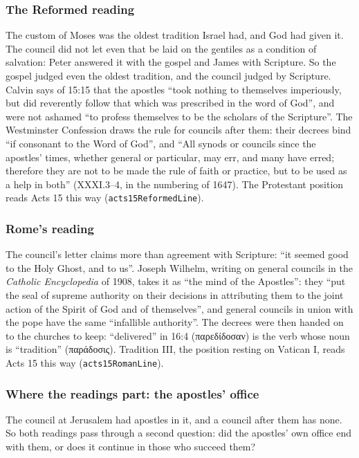 \documentclass[11pt]{article}
\begin{document}
\subsubsection*{The Reformed reading}
The custom of Moses was the oldest tradition Israel had, and God had given it. The council did not let even that be laid on the gentiles as a condition of salvation: Peter answered it with the gospel and James with Scripture. So the gospel judged even the oldest tradition, and the council judged by Scripture. Calvin says of 15:15 that the apostles “took nothing to themselves imperiously, but did reverently follow that which was prescribed in the word of God”, and were not ashamed “to profess themselves to be the scholars of the Scripture”. The Westminster Confession draws the rule for councils after them: their decrees bind “if consonant to the Word of God”, and “All synods or councils since the apostles’ times, whether general or particular, may err, and many have erred; therefore they are not to be made the rule of faith or practice, but to be used as a help in both” (XXXI.3–4, in the numbering of 1647). The Protestant position reads Acts 15 this way (\texttt{acts15\allowbreak{}Reformed\allowbreak{}Line}).

\subsubsection*{Rome’s reading}
The council’s letter claims more than agreement with Scripture: “it seemed good to the Holy Ghost, and to us”. Joseph Wilhelm, writing on general councils in the \emph{Catholic Encyclopedia} of 1908, takes it as “the mind of the Apostles”: they “put the seal of supreme authority on their decisions in attributing them to the joint action of the Spirit of God and of themselves”, and general councils in union with the pope have the same “infallible authority”. The decrees were then handed on to the churches to keep: “delivered” in 16:4 (παρεδίδοσαν) is the verb whose noun is “tradition” (παράδοσις). Tradition III, the position resting on Vatican I, reads Acts 15 this way (\texttt{acts15\allowbreak{}Roman\allowbreak{}Line}).

\subsubsection*{Where the readings part: the apostles’ office}
The council at Jerusalem had apostles in it, and a council after them has none. So both readings pass through a second question: did the apostles’ own office end with them, or does it continue in those who succeed them?
\end{document}
